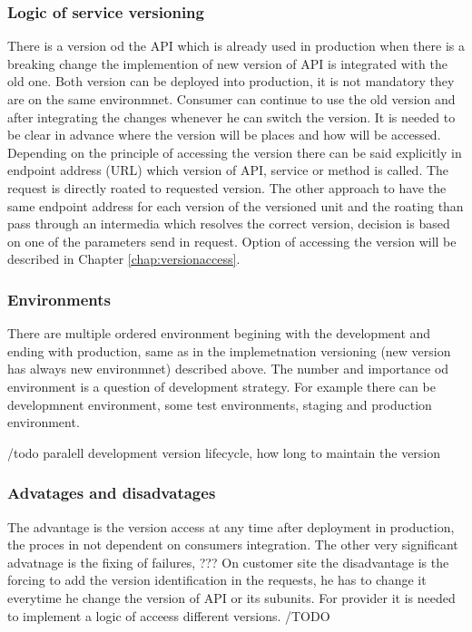 \subsubsection{Logic of service versioning}
There is a version od the API which is already used in production when there is a breaking change the implemention of new version of API is integrated with the old one. Both version can be deployed into production, it is not mandatory they are on the same environmnet. Consumer can continue to use the old version and after integrating the changes whenever he can switch the version. It is needed to be clear in advance where the version will be places and how will be accessed.
Depending on the principle of accessing the version there can be said explicitly in endpoint address (URL) which version of API, service or method is called. The request is directly roated to requested version. The other approach to have the same endpoint address for each version of the versioned unit and the roating than pass through an intermedia which resolves the correct version, decision is based on one of the parameters send in request. Option of accessing the version will be described in Chapter \ref{chap:versionaccess}.

\subsubsection{Environments}
There are multiple ordered environment begining with the development and ending with production, same as in the implemetnation versioning (new version has always new environmnet) described above. The number and importance od environment is a question of development strategy. For example there can be developmnent environment, some test environments, staging and production environment. 

/todo
paralell development
version lifecycle, how long to maintain the version

\subsubsection{Advatages and disadvatages}
The advantage is the version access at any time after deployment in production, the proces in not dependent on consumers integration. The other very significant advatnage is the fixing of failures, ???
On customer site the disadvantage is the forcing to add the version identification in the requests, he has to change it everytime he change the version of API or its subunits. For provider it is needed to implement a logic of acceess different versions.
/TODO



